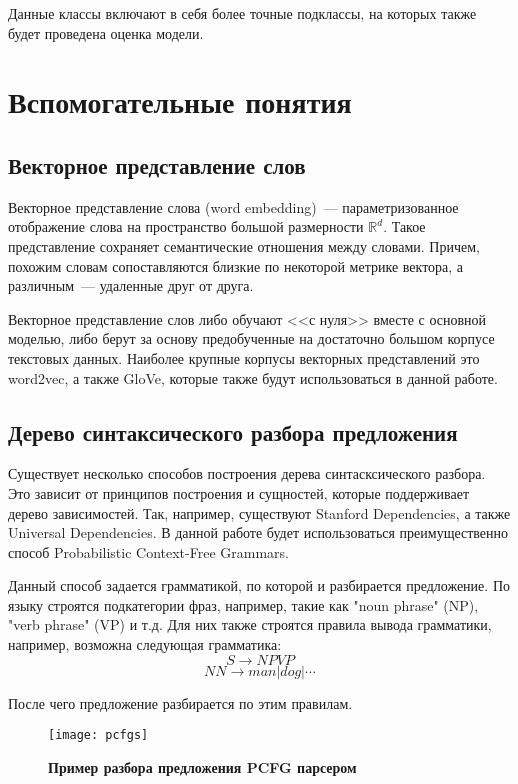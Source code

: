 Данные классы включают в себя более точные подклассы, на которых также будет проведена оценка модели.

\section{Вспомогательные понятия}

\subsection{Векторное представление слов}
Векторное представление слова (word embedding)\cite{Bengio03aneural}~--- параметризованное отображение слова на пространство большой размерности $\mathbb{R}^d$. 
Такое представление сохраняет семантические отношения между словами. 
Причем, похожим словам сопоставляются близкие по некоторой метрике вектора, 
а различным~--- удаленные друг от друга.

Векторное представление слов либо обучают <<с нуля>> вместе с основной моделью, либо берут за основу предобученные на достаточно большом корпусе текстовых данных. Наиболее крупные корпусы векторных представлений это word2vec\cite{DBLP:journals/corr/MikolovLS13, wor2vec}, а также GloVe\cite{pennington2014glove, glove}, которые также будут использоваться в данной работе.

\subsection{Дерево синтаксического разбора предложения}
Существует несколько способов построения дерева синтасксического разбора.
Это зависит от принципов построения и сущностей, которые поддерживает дерево зависимостей.
Так, например, существуют Stanford Dependencies\cite{standeps}, а также Universal Dependencies\cite{unideps}.
В данной работе будет использоваться преимущественно способ Probabilistic Context-Free Grammars\cite{pcfg}.

Данный способ задается грамматикой, по которой и разбирается предложение\cite{Klein03accurateunlexicalized}.
По языку строятся подкатегории фраз, например, такие как "noun phrase" (NP), "verb phrase" (VP) и т.д. 
Для них также строятся правила вывода грамматики, например, возможна следующая грамматика:
$$S \to NP VP$$
$$NN \to man | dog | \cdots$$

После чего предложение разбирается по этим правилам. 

\begin{figure}[h]
\texttt{[image: pcfgs]}
\caption{\textbf{Пример разбора предложения PCFG парсером}}
\label{fig:pcfgs}
\end{figure}

